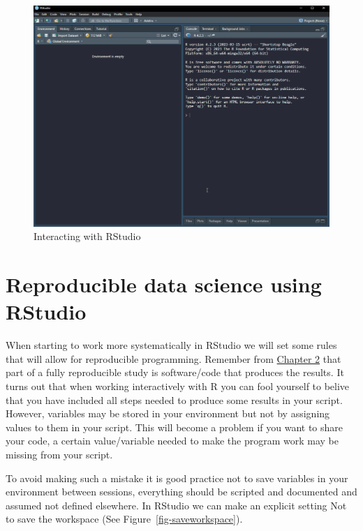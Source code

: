 \documentclass[
  11pt,
  letterpaper,
]{scrbook}
\begin{document}
\begin{figure}

{\centering \includegraphics{images/ch3/03-interactingrstudio.gif}

}

\caption{\label{fig-interactionrstudio}Interacting with RStudio}

\end{figure}

\hypertarget{reproducible-data-science-using-rstudio}{%
\section{Reproducible data science using
RStudio}\label{reproducible-data-science-using-rstudio}}

When starting to work more systematically in RStudio we will set some
rules that will allow for reproducible programming. Remember from
\protect\hyperlink{replication-and-reproducibility}{Chapter 2} that part
of a fully reproducible study is software/code that produces the
results. It turns out that when working interactively with R you can
fool yourself to belive that you have included all steps needed to
produce some results in your script. However, variables may be stored in
your environment but not by assigning values to them in your script.
This will become a problem if you want to share your code, a certain
value/variable needed to make the program work may be missing from your
script.

To avoid making such a mistake it is good practice not to save variables
in your environment between sessions, everything should be scripted and
documented and assumed not defined elsewhere. In RStudio we can make an
explicit setting Not to save the workspace (See
Figure~\ref{fig-saveworkspace}).
\end{document}

